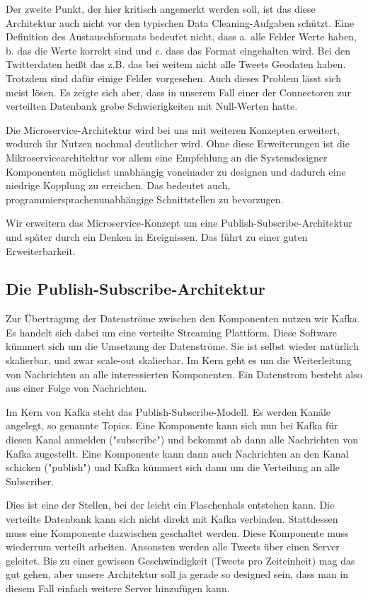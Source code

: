 \begin{itemize}
Der zweite Punkt, der hier kritisch angemerkt werden soll, ist das diese Architektur auch nicht vor den typischen
Data Cleaning-Aufgaben schützt. Eine Definition des Austauschformats bedeutet nicht, dass  a. alle Felder Werte haben,
b. das die Werte korrekt sind und c. dass das Format eingehalten wird. Bei den Twitterdaten heißt das z.B. das bei
weitem nicht alle Tweets Geodaten haben. Trotzdem sind dafür einige Felder vorgesehen. Auch dieses Problem lässt sich
meist lösen. Es zeigte sich aber, dass in unserem Fall einer der Connectoren zur verteilten Datenbank grobe Schwierigkeiten
mit Null-Werten hatte.

Die Microservice-Architektur wird bei uns mit weiteren Konzepten erweitert, wodurch ihr Nutzen nochmal deutlicher
wird. Ohne diese Erweiterungen ist die Mikroservicearchitektur vor allem eine Empfehlung an die Systemdesigner Komponenten möglichst unabhängig
voneinader zu designen und dadurch eine niedrige Kopplung zu erreichen. Das bedeutet auch, programmiersprachenunabhängige Schnittstellen zu bevorzugen.

Wir erweitern das Microservice-Konzept um eine Publish-Subscribe-Architektur und später durch ein Denken in Ereignissen.
Das führt zu einer guten Erweiterbarkeit.

\subsection{Die Publish-Subscribe-Architektur}
Zur Übertragung der Datenströme zwischen den Komponenten nutzen wir Kafka. Es handelt sich dabei um eine verteilte
Streaming Plattform.  Diese Software kümmert sich um die Umsetzung der Datenströme. Sie ist selbst wieder natürlich
skalierbar, und zwar scale-out skalierbar. Im Kern geht es um die Weiterleitung von Nachrichten an alle interessierten Komponenten.
Ein Datenstrom besteht also aus einer Folge von Nachrichten.

Im Kern von Kafka steht das Publish-Subscribe-Modell. Es werden Kanäle angelegt, so genannte Topics. Eine Komponente
kann sich nun bei Kafka für diesen Kanal anmelden ("subscribe") und bekommt ab dann alle Nachrichten von Kafka zugestellt.
Eine Komponente kann dann auch Nachrichten an den Kanal schicken ("publish") und Kafka kümmert sich dann um die Verteilung
an alle Subscriber.

Dies ist eine der Stellen, bei der leicht ein Flaschenhals entstehen kann. Die verteilte Datenbank kann sich nicht direkt
mit Kafka verbinden. Stattdessen muss eine Komponente dazwischen geschaltet werden. Diese Komponente
muss wiederrum verteilt arbeiten. Ansonsten werden alle Tweets über einen Server geleitet. Bis zu einer gewissen
Geschwindigkeit (Tweets pro Zeiteinheit) mag das gut gehen, aber unsere Architektur soll ja gerade so designed sein,
dass man in diesem Fall einfach weitere Server hinzufügen kann.


\end{itemize}
